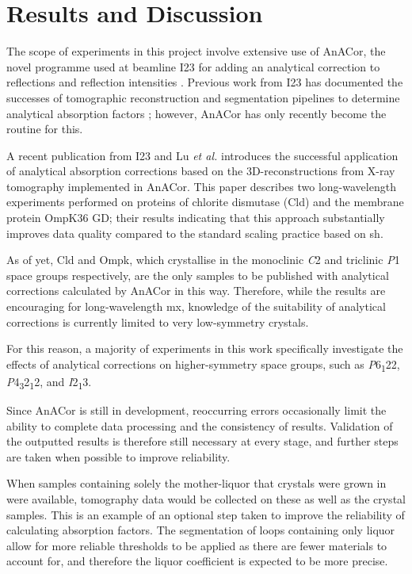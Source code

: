 \section{Results and Discussion}

The scope of experiments in this project involve extensive use of AnACor, the novel programme used at beamline I23 for adding an analytical correction to reflections and reflection intensities \cite{Lu2024}. Previous work from I23 has documented the successes of tomographic reconstruction and segmentation pipelines to determine analytical absorption factors \cite{Kazantsev2021}; however, AnACor has only recently become the routine for this.

A recent publication from I23 and Lu \textit{et al.} \cite{Lu2024} introduces the successful application of analytical absorption corrections based on the 3D-reconstructions from X-ray tomography implemented in AnACor. This paper describes two long-wavelength experiments performed on proteins of chlorite dismutase (Cld) and the membrane protein OmpK36 GD; their results indicating that this approach substantially improves data quality compared to the standard scaling practice based on \ac{sh}.

As of yet, Cld and Ompk, which crystallise in the monoclinic \textit{C}2 and triclinic \textit{P}1 space groups respectively, are the only samples to be published with analytical corrections calculated by AnACor in this way. Therefore, while the results are encouraging for long-wavelength \ac{mx}, knowledge of the suitability of analytical corrections is currently limited to very low-symmetry crystals.

For this reason, a majority of experiments in this work specifically investigate the effects of analytical corrections on higher-symmetry space groups, such as \textit{P}6\textsubscript{1}22, \textit{P}4\textsubscript{3}2\textsubscript{1}2, and \textit{I}2\textsubscript{1}3.

Since AnACor is still in development, reoccurring errors occasionally limit the ability to complete data processing and the consistency of results. Validation of the outputted results is therefore still necessary at every stage, and further steps are taken when possible to improve reliability.

When samples containing solely the mother-liquor that crystals were grown in were available, tomography data would be collected on these as well as the crystal samples. This is an example of an optional step taken to improve the reliability of calculating absorption factors. The segmentation of loops containing only liquor allow for more reliable thresholds to be applied as there are fewer materials to account for, and therefore the liquor coefficient is expected to be more precise.

